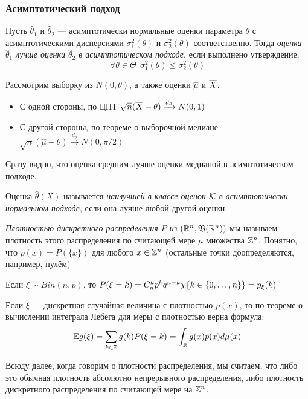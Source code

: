 \subsubsection{Асимптотический подход}

\begin{definition}
	Пусть $\hat{\theta}_1$ и $\hat{\theta}_2$ --- асимптотически нормальные оценки параметра $\theta$ с асимптотическими дисперсиями $\sigma_1^2(\theta)$ и $\sigma_2^2(\theta)$ соответственно. Тогда \textit{оценка $\hat{\theta}_1$ лучше оценки $\hat{\theta}_2$ в асимптотическом подходе}, если выполнено утверждение:
	\[
		\forall \theta \in \Theta\ \ \sigma_1^2(\theta) \le \sigma_2^2(\theta)
	\]
\end{definition}

\begin{example}
	Рассмотрим выборку из $N(0, \theta)$, а также оценки $\hat{\mu}$ и $\overline{X}$.
	\begin{itemize}
		\item С одной стороны, по ЦПТ $\sqrt{n}(\overline{X} - \theta) \xrightarrow{d_\theta} N(0, 1)$
		
		\item С другой стороны, по теореме о выборочной медиане $\sqrt{n}(\hat{\mu} - \theta) \xrightarrow{d_{\theta}} N(0, \pi / 2)$
	\end{itemize}
	Сразу видно, что оценка средним лучше оценки медианой в асимптотическом подходе.
\end{example}

\begin{definition}
	Оценка $\hat{\theta}(X)$ называется \textit{наилучшей в классе оценок $\mathcal{K}$ в асимптотически нормальном подходе}, если она лучше любой другой оценки.
\end{definition}

\begin{note}
	\textit{Плотностью дискретного распределения $P$ из $(\mathbb{R}^n, \mathfrak{B}(\mathbb{R}^n))$} мы называем плотность этого распределения по считающей мере $\mu$ множества $\mathbb{Z}^n$. Понятно, что $p(x) = P(\{x\})$ для любого $x \in \mathbb{Z}^n$ (остальные точки доопределяются, например, нулём)
\end{note}

\begin{example}
	Если $\xi \sim Bin(n, p)$, то $P(\xi = k) = C_n^kp^kq^{n - k}\chi\{k \in \{0, \ldots, n\}\} = p_\xi(k)$
\end{example}

\begin{reminder}
	Если $\xi$ --- дискретная случайная величина с плотностью $p(x)$, то по теореме о вычислении интеграла Лебега для меры с плотностью верна формула:
	\[
		\mathbb{E} g(\xi) = \sum_{k \in \mathbb{Z}} g(k)P(\xi = k) = \int_{\mathbb{R}} g(x)p(x)d\mu(x)
	\]
\end{reminder}

\begin{note}
	Всюду далее, когда говорим о плотности распределения, мы считаем, что либо это обычная плотность абсолютно непрерывного распределения, либо плотность дискретного распределения по считающей мере на $\mathbb{Z}^n$.
\end{note}